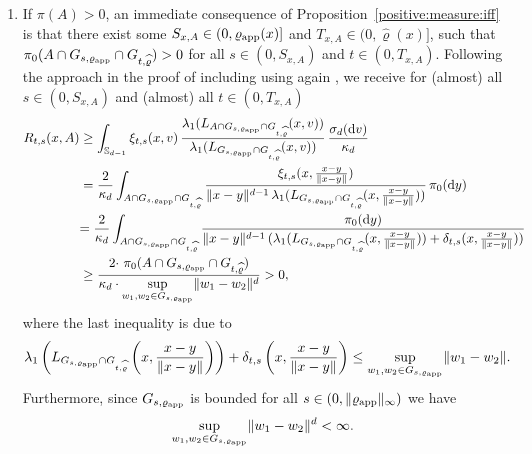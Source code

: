 \documentclass[sn-mathphys-num]{sn-jnl}%
\theoremstyle{thmstyleone}%
\theoremstyle{thmstyletwo}%
\theoremstyle{thmstylethree}%
\newcommand{\rhoapp}{\varrho_{{\rm app}}}
\newcommand{\change}[1]{\bgroup\color{black}#1\egroup}    %
\begin{document}
\begin{appendices}
\begin{enumerate}
     \item If $\pi(A)>0$, an immediate consequence of Proposition~\ref{positive:measure:iff} is that there exist some $S_{x,A}\in(0, \rhoapp(x)]$ and $T_{x,A}\in(0, \widehat{\varrho}(x)]$, such that $\pi_0(A\cap G_{s, \varrho_{\textmd{app}}}\cap G_{t, \widehat{\varrho}}) > 0$ for all $s\in(0, S_{x,A})$ and $t\in(0, T_{x,A})$. Following the approach in the proof of \cite[Lemma~11]{LatuszynskiRudolf2024} including using again \cite[Theorem~15.13]{Schilling2005}, we receive for (almost) all $s\in(0, S_{x,A})$ and (almost) all $t\in(0, T_{x,A})$
     \begin{align*}
      R_{t,s}(x,A)&\geq \int_{\mathbb{S}_{d-1}} \xi_{t,s}(x,v) \, \frac{\lambda_1(L_{A \cap G_{s,\varrho_{\textmd{app}}}\cap G_{t,\widehat{\varrho}}}(x,v))}  {\lambda_1(L_{G_{s,\varrho_{\textmd{app}}}\cap G_{t,\widehat{\varrho}}}(x,v))}  \, \frac{\sigma_d(\mathrm{d}v)}{\kappa_d} \\ 
      & = \frac{2}{\kappa_d} \int_{A\cap G_{s,\varrho_{\textmd{app}}}\cap G_{t,\widehat{\varrho}}} \frac{\xi_{t,s}(x,\frac{x-y}{\|x-y\|})}{\|x-y\|^{d-1} \, \lambda_1(L_{G_{s,\varrho_{\textmd{app}}}\cap G_{t,\widehat{\varrho}}}(x,\frac{x-y}{\|x-y\|}))}  \, \pi_0(\mathrm{d}y) \\
      & \change{= \frac{2}{\kappa_d} \int_{A\cap G_{s,\varrho_{\textmd{app}}}\cap G_{t,\widehat{\varrho}}} \frac{\pi_0(\mathrm{d}y)}{\|x-y\|^{d-1} \, (\lambda_1(L_{G_{s,\varrho_{\textmd{app}}}\cap G_{t,\widehat{\varrho}}}(x,\frac{x-y}{\|x-y\|}))+\delta_{t,s}(x, \frac{x-y}{\|x-y\|}))}} \\
      &\geq\frac{\change{2 \cdot }\ \pi_0(A\cap G_{s,\varrho_{\textmd{app}}}\cap G_{t,\widehat{\varrho}})}{\kappa_d\cdot \underset{w_1,w_2\in G_{s,\varrho_{\textmd{app}}}}{\sup}\| w_1-w_2 \|^d}>0,
 \end{align*}
where the last inequality is due to %
\[
   \lambda_1\left(L_{G_{s,\varrho_{\textmd{app}}}\cap G_{t,\widehat{\varrho}}}\left(x,\change{\frac{x-y}{\|x-y\|}}\right)\right)+\delta_{t,s}\left(x,\change{\frac{x-y}{\|x-y\|}}\right)\leq \underset{w_1,w_2\in G_{s,\varrho_{\textmd{app}}}}{\sup}\| w_1-w_2 \|. 
\]
\change{Furthermore, since $G_{s,\rhoapp}$ is bounded for all $s\in(0,\|\rhoapp\|_\infty)$ we have
\[
   \underset{w_1,w_2\in G_{s,\varrho_{\textmd{app}}}}{\sup}\| w_1-w_2 \|^d<\infty.
\]
}


\end{enumerate}
\end{appendices}
\end{document}
